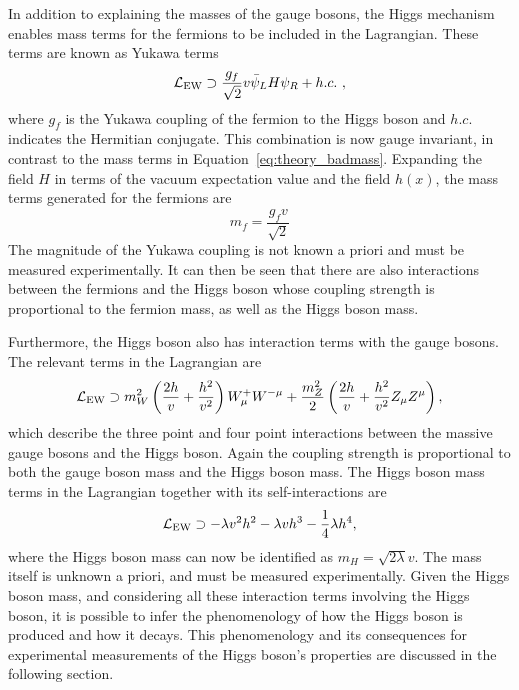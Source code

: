In addition to explaining the masses of the gauge bosons, 
the Higgs mechanism enables mass terms for the fermions to be included in the Lagrangian.
These terms are known as Yukawa terms~\cite{Thomson}
\begin{equation}
\mathcal{L}_{\textrm{EW}} \supset \frac{g_f}{\sqrt{2}} v \bar{\psi}_L H \psi_R + h.c.~,
\end{equation}
where $g_f$ is the Yukawa coupling of the fermion to the Higgs boson 
and $h.c.$ indicates the Hermitian conjugate.
This combination is now gauge invariant, 
in contrast to the mass terms in Equation~\ref{eq:theory_badmass}.
Expanding the field $H$ in terms of the vacuum expectation value and the field $h(x)$, 
the mass terms generated for the fermions are 
\begin{equation}
m_f = \frac{g_f v}{\sqrt{2}}
\end{equation}
The magnitude of the Yukawa coupling is not known a priori and must be measured experimentally.
It can then be seen that there are also interactions between the fermions and the Higgs boson
whose coupling strength is proportional to the fermion mass, as well as the Higgs boson mass. %

Furthermore, the Higgs boson also has interaction terms with the gauge bosons.
The relevant terms in the Lagrangian are
\begin{equation}
\mathcal{L}_{\textrm{EW}} \supset m_W^2 \left( \frac{2h}{v} + \frac{h^2}{v^2} \right) W^+_\mu W^{-\mu}
                 + \frac{m_Z^2}{2} \left( \frac{2h}{v} + \frac{h^2}{v^2} Z_\mu Z^{\mu} \right),
\end{equation}
which describe the three point and four point interactions between the massive gauge bosons 
and the Higgs boson.
Again the coupling strength is proportional to both the gauge boson mass and the Higgs boson mass.
The Higgs boson mass terms in the Lagrangian together with its self-interactions are 
\begin{equation}
\mathcal{L}_{\textrm{EW}} \supset - \lambda v^2 h^2 - \lambda v h^3 - \frac{1}{4} \lambda h^4 ,
\end{equation}
where the Higgs boson mass can now be identified as $m_H = \sqrt{2\lambda}v$.
The mass itself is unknown a priori, and must be measured experimentally.
Given the Higgs boson mass, and considering all these interaction terms involving the Higgs boson, 
it is possible to infer the phenomenology of how the Higgs boson is produced and how it decays.
This phenomenology and its consequences for experimental measurements 
of the Higgs boson's properties are discussed in the following section.

